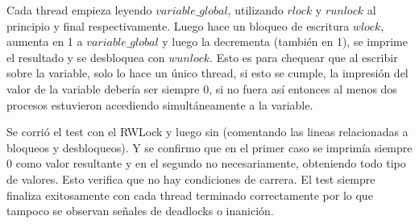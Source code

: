 Cada thread empieza leyendo $variable\_global$, utilizando $rlock$ y $runlock$ al principio y final respectivamente. Luego hace un bloqueo de escritura $wlock$, aumenta en 1 a $variable\_global$ y luego la decrementa (también en 1), se imprime el resultado y se desbloquea con $wunlock$. Esto es para chequear que al escribir sobre la variable, solo lo hace un único thread, si esto se cumple, la impresión del valor de la variable debería ser siempre $0$, si no fuera así entonces al menos dos procesos estuvieron accediendo simultáneamente a la variable.

Se corrió el test con el RWLock y luego sin (comentando las lineas relacionadas a bloqueos y desbloqueos). Y se confirmo que en el primer caso se imprimía siempre 0 como valor resultante y en el segundo no necesariamente, obteniendo todo tipo de valores. Esto verifica que no hay condiciones de carrera. El test siempre finaliza exitosamente con cada thread terminado correctamente por lo que tampoco se observan señales de deadlocks o inanición.
